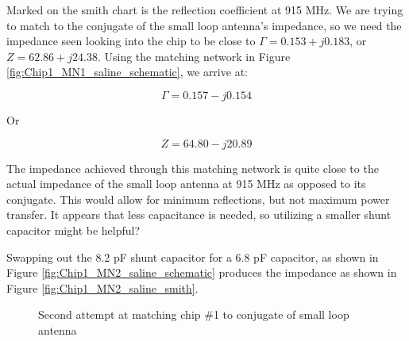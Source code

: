 \documentclass[12pt,onecolumn,titlepage]{article}
\begin{document}
Marked on the smith chart is the reflection coefficient at 915 MHz. We are trying to match to the conjugate of the small loop antenna's impedance, so we need the impedance seen looking into the chip to be close to $\Gamma = 0.153 + j0.183$, or $Z = 62.86 + j24.38$. Using the matching network in Figure \ref{fig:Chip1_MN1_saline_schematic}, we arrive at:

\[ \Gamma = 0.157 - j0.154 \]

Or

\[Z = 64.80 - j20.89 \]

The impedance achieved through this matching network is quite close to the actual impedance of the small loop antenna at 915 MHz as opposed to its conjugate. This would allow for minimum reflections, but not maximum power transfer. It appears that less capacitance is needed, so utilizing a smaller shunt capacitor might be helpful?

Swapping out the 8.2 pF shunt capacitor for a 6.8 pF capacitor, as shown in Figure \ref{fig:Chip1_MN2_saline_schematic} produces the impedance as shown in Figure \ref{fig:Chip1_MN2_saline_smith}.


\begin{figure}[htbp]
	\centering
		\quad
	\label{fig:Chip1_MN2_saline}
	\caption{Second attempt at matching chip \#1 to conjugate of small loop antenna}
\end{figure}
\end{document}
